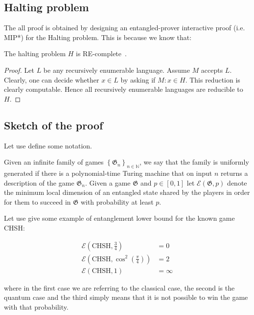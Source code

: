 
\subsection{Halting problem}
The all proof is obtained by designing an entangled-prover interactive proof (i.e. MIP*) for the Halting problem. This is because we know that:
\begin{theorem}
    The halting problem $H$ is RE-complete~\cite{Algorithms}.
\begin{proof}
    Let $L$ be any recursively enumerable language. Assume $M$ accepts $L$. Clearly, one can decide whether $x \in L$ by asking if $M: x \in H$. This reduction is clearly computable. Hence all recursively enumerable languages are reducible to $H$.
\end{proof}
\end{theorem}

\subsection{Sketch of the proof}
Let use define some notation.
\begin{defn}
    Given an infinite family of games $\left\{\mathfrak{G}_{n}\right\}_{n \in \mathbb{N}}$, we say that the family is uniformly generated if there is a polynomial-time Turing machine that on input $n$ returns a description of the game $\mathfrak{G}_{n}$. Given a game $\mathfrak{G}$ and $p \in[0,1]$ let $\mathscr{E}(\mathfrak{G}, p)$ denote the minimum local dimension of an entangled state shared by the players in order for them to succeed in $\mathfrak{G}$ with probability at least $p$.
\end{defn}



Let use give some example of entanglement lower bound for the known game CHSH:

\begin{align}
    \mathscr{E}\left(\text{CHSH}, \frac{3}{4}\right) &= 0 \\
    \mathscr{E}\left(\text{CHSH}, \cos^2\left({\frac{\pi}{4}}\right)\right) &= 2 \\
    \mathscr{E}(\text{CHSH}, 1) &= \infty
\end{align}

where in the first case we are referring to the classical case, the second is the quantum case and the third simply means that it is not possible to win the game with that probability.



